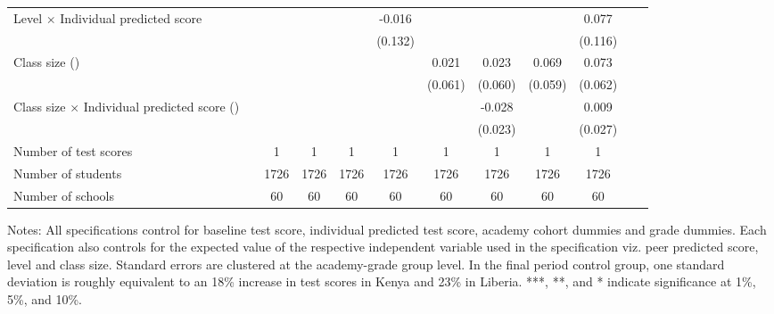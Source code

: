 \begin{center}
\begin{scriptsize}
\begin{threeparttable}
\begin{tabular} {@{} l l c c c c c c c c c c  @{}}
Level $\times$ Individual predicted score &  &  &  &  & -0.016 &  &  &  & 0.077 \\
                 &  &  &  &  & (0.132) &  &  &  & (0.116) \\
Class size (\times 10) &  &  &  &  &  & 0.021 & 0.023 & 0.069 & 0.073 \\
                 &  &  &  &  &  & (0.061) & (0.060) & (0.059) & (0.062) \\
Class size $\times$ Individual predicted score (\times 10) &  &  &  &  &  &  & -0.028 &  & 0.009 \\
                 &  &  &  &  &  &  & (0.023) &  & (0.027) \\
\midrule
Number of test scores &  & 1 & 1 & 1 & 1 & 1 & 1 & 1 & 1 \\
Number of students &  & 1726 & 1726 & 1726 & 1726 & 1726 & 1726 & 1726 & 1726 \\
Number of schools &  & 60 & 60 & 60 & 60 & 60 & 60 & 60 & 60 \\
\bottomrule
\end{tabular}
\begin{tablenotes}
\item Notes: All specifications control for baseline test score, individual predicted test score, academy cohort dummies and grade dummies. Each specification also controls for the expected value of the respective independent variable used in the specification viz. peer predicted score, level and class size. Standard errors are clustered at the academy-grade group level. In the final period control group, one standard deviation is roughly equivalent to an 18\% increase in test scores in Kenya and 23\% in Liberia. ***, **, and * indicate significance at 1\%, 5\%, and 10\%.\end{tablenotes}
\end{threeparttable}
\end{scriptsize}
\end{center}
\clearpage
